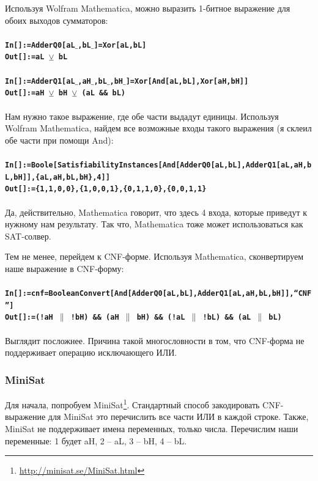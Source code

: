 Используя Wolfram Mathematica, можно выразить 1-битное выражение для обоих выходов сумматоров:\\
\\
\textbf{\texttt{In[]:=AdderQ0[aL$\_$,bL$\_$]=Xor[aL,bL]}} \\
\textbf{\texttt{Out[]:=aL $\veebar$ bL}} \\
\\
\textbf{\texttt{In[]:=AdderQ1[aL$\_$,aH$\_$,bL$\_$,bH$\_$]=Xor[And[aL,bL],Xor[aH,bH]]}} \\
\textbf{\texttt{Out[]:=aH $\veebar$ bH $\veebar$ (aL \&\& bL)}} \\
\\
Нам нужно такое выражение, где обе части выдадут единицы.
Используя Wolfram Mathematica, найдем все возможные входы такого выражения (я склеил обе части при помощи And): \\
\\
\textbf{\texttt{In[]:=Boole[SatisfiabilityInstances[And[AdderQ0[aL,bL],AdderQ1[aL,aH,bL,bH]],\{aL,aH,bL,bH\},4]]}} \\
\textbf{\texttt{Out[]:=\{1,1,0,0\},\{1,0,0,1\},\{0,1,1,0\},\{0,0,1,1\}}} \\
\\
Да, действительно, Mathematica говорит, что здесь 4 входа, которые приведут к нужному нам результату.
Так что, Mathematica тоже может использоваться как \ac{SAT}-солвер.

Тем не менее, перейдем к CNF-форме. Используя Mathematica, сконвертируем наше выражение в CNF-форму:\\
\\
\textbf{\texttt{In[]:=cnf=BooleanConvert[And[AdderQ0[aL,bL],AdderQ1[aL,aH,bL,bH]],``CNF'']}} \\
\textbf{\texttt{Out[]:=(!aH $\|$ !bH) \&\& (aH $\|$ bH) \&\& (!aL $\|$ !bL) \&\& (aL $\|$ bL)}} \\
\\
Выглядит посложнее. Причина такой многословности в том, что \ac{CNF}-форма не поддерживает операцию исключающего
ИЛИ.

\subsubsection{MiniSat}

Для начала, попробуем MiniSat\footnote{\url{http://minisat.se/MiniSat.html}}.
Стандартный способ закодировать \ac{CNF}-выражение для MiniSat это перечислить все части ИЛИ в каждой строке.
Также, MiniSat не поддерживает имена переменных, только числа.
Перечислим наши переменные: 1 будет aH, 2 -- aL, 3 -- bH, 4 -- bL.

